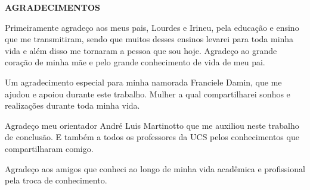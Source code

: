 \begin{center}
\textbf{AGRADECIMENTOS}
\end{center}

Primeiramente agradeço aos meus pais, Lourdes e Irineu, pela educação e ensino que me transmitiram, sendo que
muitos desses ensinos levarei para toda minha vida e além disso me tornaram a pessoa que sou hoje.
Agradeço ao grande coração de minha mãe e pelo grande conhecimento de vida de meu pai.

Um agradecimento especial para minha namorada Franciele Damin, que me ajudou e apoiou durante este trabalho. Mulher a qual compartilharei 
sonhos e realizações durante toda minha vida.

Agradeço meu orientador André Luis Martinotto que me auxiliou neste trabalho de conclusão. E também a todos os professores da UCS pelos 
conhecimentos que compartilharam comigo.

Agradeço aos amigos que conheci ao longo de minha vida acadêmica e profissional pela troca de conhecimento.
